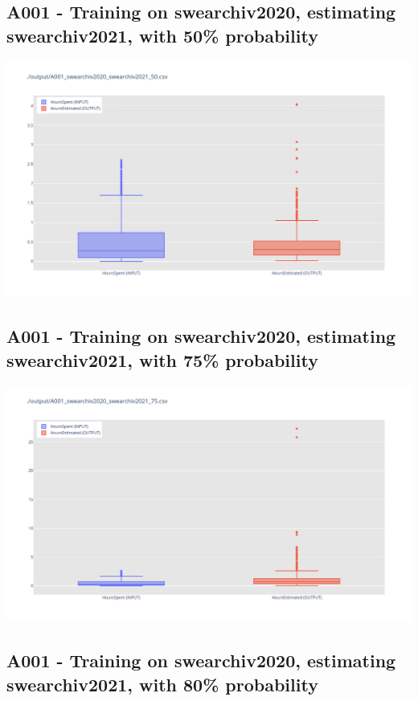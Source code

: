 \newpage

\subsection{A001 - Training on swearchiv2020, estimating swearchiv2021, with 50\% probability}

\includegraphics[width=\textwidth]{Scripts/output/A001_swearchiv2020_swearchiv2021_50.csv.png}

\newpage

\subsection{A001 - Training on swearchiv2020, estimating swearchiv2021, with 75\% probability}

\includegraphics[width=\textwidth]{Scripts/output/A001_swearchiv2020_swearchiv2021_75.csv.png}

\newpage

\subsection{A001 - Training on swearchiv2020, estimating swearchiv2021, with 80\% probability}

